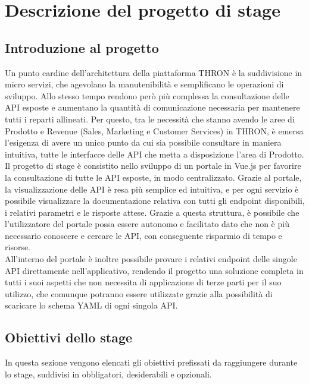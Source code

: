 \chapter{Descrizione del progetto di stage}
\label{cap:descrizione-stage}


\section{Introduzione al progetto}
Un punto cardine dell'architettura della piattaforma THRON è la suddivisione in micro servizi, che agevolano la manutenibilità e semplificano le operazioni di sviluppo.
Allo stesso tempo rendono però più complessa la consultazione delle API esposte e aumentano la quantità di comunicazione necessaria per mantenere tutti i reparti allineati.
Per questo, tra le necessità che stanno avendo le aree di Prodotto e Revenue (Sales, Marketing e Customer Services) in THRON, è emersa l'esigenza di avere un unico punto
da cui sia possibile consultare in maniera intuitiva, tutte le interfacce delle API che metta a disposizione l'area di Prodotto.\\
Il progetto di stage è consistito nello sviluppo di un portale in Vue.js per favorire la consultazione di tutte le API esposte, in modo centralizzato.
Grazie al portale, la visualizzazione delle API è resa più semplice ed intuitiva, e per ogni servizio è possibile visualizzare la documentazione relativa 
con tutti gli endpoint disponibili, i relativi parametri e le risposte attese. Grazie a questa struttura, è possibile che l'utilizzatore del portale possa essere autonomo 
e facilitato dato che non è più necessario conoscere e cercare le API, con conseguente risparmio di tempo e risorse.\\
All'interno del portale è inoltre possibile provare i relativi endpoint delle singole API direttamente nell'applicativo, rendendo il progetto una soluzione completa
in tutti i suoi aspetti che non necessita di applicazione di terze parti per il suo utilizzo, che comunque potranno essere utilizzate grazie alla possibilità di scaricare
lo schema YAML di ogni singola API.


\section{Obiettivi dello stage}
In questa sezione vengono elencati gli obiettivi prefissati da raggiungere durante lo stage, suddivisi in obbligatori, desiderabili e opzionali.


